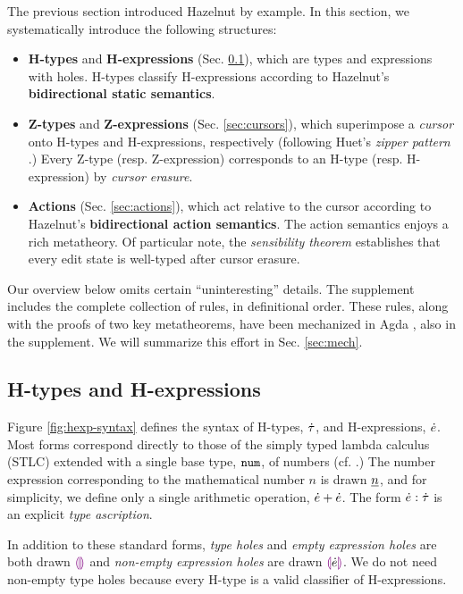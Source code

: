 
The previous section introduced Hazelnut by example. In this section, we systematically introduce the following  structures:
\begin{itemize}[itemsep=0px,partopsep=2px,topsep=2px]
\item \textbf{H-types} and \textbf{H-expressions} (Sec. \ref{sec:holes}), which are types and expressions with {holes}. H-types classify H-expressions according to Hazelnut's \textbf{bidirectional static semantics}.
\item \textbf{Z-types} and \textbf{Z-expressions} (Sec. \ref{sec:cursors}), which superimpose\- a \emph{cursor} onto H-types and H-expressions, respectively (following Huet's \emph{zipper pattern} \cite{JFP::Huet1997}.) Every Z-type (resp. Z-expression) corresponds to an H-type (resp. H-expression) by \emph{cursor erasure}.
\item \textbf{Actions} (Sec. \ref{sec:actions}), which act relative to the cursor according to Hazelnut's \textbf{bidirectional action semantics}. The action semantics enjoys a rich metatheory. Of particular note, the \emph{sensibility theorem} establishes that every edit state is well-typed after cursor erasure.
\end{itemize}

Our overview below omits certain ``uninteresting'' details. The supplement includes the complete collection of rules, in definitional order. These rules, along with the proofs of two key metatheorems, have been mechanized in Agda \cite{norell:thesis}, also in the supplement. We will summarize this effort in Sec. \ref{sec:mech}.%

\subsection{H-types and H-expressions}\label{sec:holes}
Figure \ref{fig:hexp-syntax} defines the syntax of H-types, $\dot{\tau}$, and H-expressions, $\dot{e}$. Most forms correspond directly to those of the simply typed lambda calculus (STLC) extended with a single base type, $\texttt{num}$, of numbers (cf. \cite{pfpl}.) The number expression corresponding to the mathematical number $n$ is drawn $\underline{n}$, and for simplicity, we define only a single arithmetic operation, $\dot{e} + \dot{e}$. The form $\dot{e} : \dot{\tau}$ is an explicit \emph{type ascription}. 

In addition to these standard forms, \emph{type holes} and \emph{empty expression holes} are both drawn $\textcolor{violet}{\llparenthesis}\textcolor{violet}{\rrparenthesis}$ and \emph{non-empty expression holes} are drawn $\textcolor{violet}{\llparenthesis}\dot{e}\textcolor{violet}{\rrparenthesis}$. We do not need non-empty type holes because every H-type is a valid classifier of H-expressions. 

